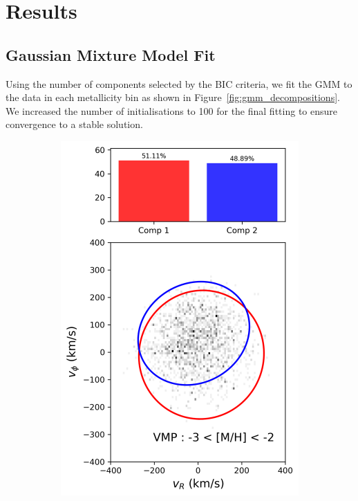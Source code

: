 \documentclass[a4paper,12pt]{article}
\begin{document}
 
\section{Results}
\label{sec:results1}

\subsection{Gaussian Mixture Model Fit}
\label{subsec:gmm}

Using the number of components selected by the BIC criteria, we fit the GMM to the data in each metallicity bin as shown in 
Figure~\ref{fig:gmm_decompositions}. We increased the number of initialisations to 100 for the final fitting to ensure convergence to a
stable solution.

\begin{figure}[h]
    \centering
    \begin{subfigure}[t]{0.24\textwidth}
        \centering
        \includegraphics[width=\linewidth]{../figures/gmm_VMP.png}

\end{subfigure}
\end{figure}
\end{document}
